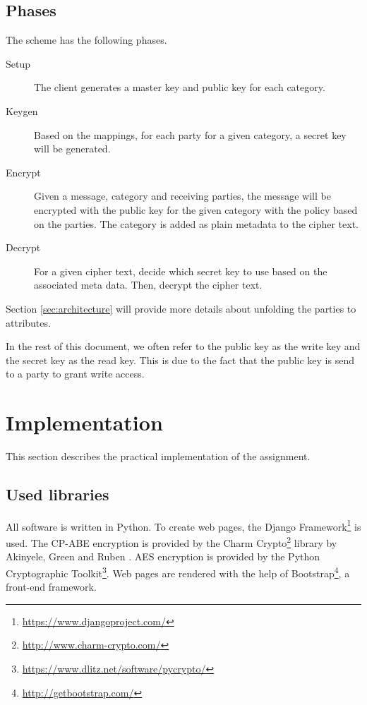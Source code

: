 \documentclass[a4paper]{article}
\begin{document}
	\subsection{Phases}
		The scheme has the following phases.
	
		\begin{description}
			\item[Setup]
			The client generates a master key and public key for each category.
			\item[Keygen]
			Based on the mappings, for each party for a given category, a secret key will be generated. 
			\item[Encrypt]
			Given a message, category and receiving parties, the message will be encrypted with the public key for the given category with the policy based on the parties. The category is added as plain metadata to the cipher text.
			\item[Decrypt]
			For a given cipher text, decide which secret key to use based on the associated meta data. Then, decrypt the cipher text.
		\end{description}
		
		Section \ref{sec:architecture} will provide more details about unfolding the parties to attributes.
		
		In the rest of this document, we often refer to the public key as the write key and the secret key as the read key. This is due to the fact that the public key is send to a party to grant write access.
    
\section{Implementation}
	This section describes the practical implementation of the assignment.
	
	\subsection{Used libraries}
		All software is written in Python. To create web pages, the Django Framework\footnote{\url{https://www.djangoproject.com/}} is used. The CP-ABE encryption is provided by the Charm Crypto\footnote{\url{http://www.charm-crypto.com/}} library by Akinyele, Green and Ruben \cite{cryptoeprint:2011:617}. AES encryption is provided by the Python Cryptographic Toolkit\footnote{\url{https://www.dlitz.net/software/pycrypto/}}. Web pages are rendered with the help of Bootstrap\footnote{\url{http://getbootstrap.com/}}, a front-end framework.
	
\end{document}
